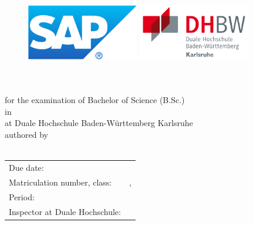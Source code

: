 \thispagestyle{empty}
\begin{titlepage}
\enlargethispage{4cm}

\begin{figure}          
	\begin{minipage}{0.49\textwidth}
		\flushleft
		\includegraphics[height=2.5cm]{Bilder/Logos/Logo_SAP.pdf} 
	\end{minipage}
	\hfill
	\begin{minipage}{0.49\textwidth}
		\flushright
		\includegraphics[height=2.5cm]{Bilder/Logos/Logo_DHBW.pdf} 
	\end{minipage}
\end{figure} 
\vspace*{0.1cm}

\begin{center}
	\huge{\textbf{\titel}}\\[1cm]
	\Large{\textbf{\arbeit}}\\[0.5cm]
	\normalsize{for the examination of Bachelor of Science (B.Sc.)}\\[0.2cm]
	\normalsize{in \textbf{\studiengang}}\\[1ex]
	\normalsize{at Duale Hochschule Baden-Württemberg Karlsruhe}\\[0.5cm]
	\normalsize{authored by}\\[1ex] \Large{\textbf{\autor}} \\
\end{center}

\begin{center}
	\vfill
	\begin{tabular}{ll}
		Due date:                     & \abgabe \\[0.2cm]
		Matriculation number, class:            & \matrikelnr , \kurs \\[0.2cm]
		Period: & \bearbeitungszeitraum \\[0.2cm]
		Inspector at Duale Hochschule: & \betreuerDhbw \\[2cm]
	\end{tabular} 
\end{center}
\end{titlepage}
